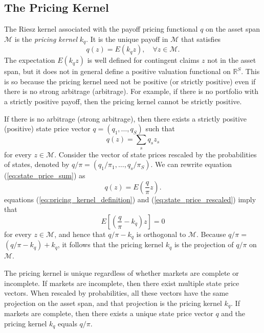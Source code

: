 \documentclass[\topdir/lecture\_notes.tex]{subfiles}
\begin{document}
\subsection{The Pricing Kernel}
The Riesz kernel associated with the payoff pricing functional \(q\) on the asset span \(\mathcal{M}\) is the \emph{pricing kernel} \(k_{q}\). It is the unique payoff in \(\mathcal{M}\) that satisfies
\begin{equation}
q(z)=E(k_{q} z), \quad \forall z \in \mathcal{M}. \label{eq:pricing_kernel_definition} 
\end{equation}
The expectation \(E(k_{q} z)\) is well defined for contingent claims \(z\) not in the asset span, but it does not in general define a positive valuation functional on \(\mathbb{R}^{S}\). This is so because the pricing kernel need not be positive (or strictly positive) even if there is no strong arbitrage (arbitrage). For example, if there is no portfolio with a strictly positive payoff, then the pricing kernel cannot be strictly positive.

If there is no arbitrage (strong arbitrage), then there exists a strictly positive (positive) state price vector \(q=(q_{1}, \ldots, q_{S})\) such that
\begin{equation}
q(z)=\sum_{s} q_{s} z_{s} \label{eq:state_price_sum}
\end{equation}
for every \(z \in \mathcal{M}\). Consider the vector of state prices rescaled by the probabilities of states, denoted by \(q / \pi=(q_{1} / \pi_{1}, \ldots, q_{s} / \pi_{S})\). We can rewrite equation (\ref{eq:state_price_sum}) as
\begin{equation}
q(z)=E(\frac{q}{\pi} z). \label{eq:state_price_rescaled}
\end{equation}
equations (\ref{eq:pricing_kernel_definition}) and (\ref{eq:state_price_rescaled}) imply that
\begin{equation}
E\left[(\frac{q}{\pi}-k_{q}) z\right]=0 \label{eq:orthogonality_condition}
\end{equation}
for every \(z \in \mathcal{M}\), and hence that \(q / \pi-k_{q}\) is orthogonal to \(\mathcal{M}\). Because \(q / \pi=\) \(\left(q / \pi-k_{q}\right)+k_{q}\), it follows that the pricing kernel \(k_{q}\) is the projection of \(q / \pi\) on \(\mathcal{M}\).

The pricing kernel is unique regardless of whether markets are complete or incomplete. If markets are incomplete, then there exist multiple state price vectors. When rescaled by probabilities, all these vectors have the same projection on the asset span, and that projection is the pricing kernel \(k_{q}\). If markets are complete, then there exists a unique state price vector \(q\) and the pricing kernel \(k_{q}\) equals \(q / \pi\).
\end{document}

